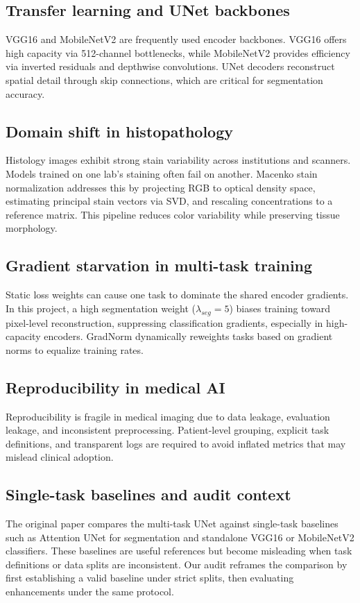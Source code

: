 \documentclass[conference,a4paper]{IEEEtran}
\begin{document}
\subsection{Transfer learning and UNet backbones}
VGG16 and MobileNetV2 are frequently used encoder backbones. VGG16 offers high capacity via 512-channel bottlenecks, while MobileNetV2 provides efficiency via inverted residuals and depthwise convolutions. UNet decoders reconstruct spatial detail through skip connections, which are critical for segmentation accuracy.

\subsection{Domain shift in histopathology}
Histology images exhibit strong stain variability across institutions and scanners. Models trained on one lab's staining often fail on another. Macenko stain normalization addresses this by projecting RGB to optical density space, estimating principal stain vectors via SVD, and rescaling concentrations to a reference matrix. This pipeline reduces color variability while preserving tissue morphology.

\subsection{Gradient starvation in multi-task training}
Static loss weights can cause one task to dominate the shared encoder gradients. In this project, a high segmentation weight ($\lambda_{seg}=5$) biases training toward pixel-level reconstruction, suppressing classification gradients, especially in high-capacity encoders. GradNorm dynamically reweights tasks based on gradient norms to equalize training rates.

\subsection{Reproducibility in medical AI}
Reproducibility is fragile in medical imaging due to data leakage, evaluation leakage, and inconsistent preprocessing. Patient-level grouping, explicit task definitions, and transparent logs are required to avoid inflated metrics that may mislead clinical adoption.

\subsection{Single-task baselines and audit context}
The original paper compares the multi-task UNet against single-task baselines such as Attention UNet for segmentation and standalone VGG16 or MobileNetV2 classifiers. These baselines are useful references but become misleading when task definitions or data splits are inconsistent. Our audit reframes the comparison by first establishing a valid baseline under strict splits, then evaluating enhancements under the same protocol.
\end{document}
